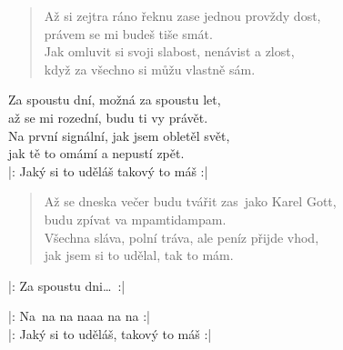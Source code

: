 \begin{song}{}
\begin{verse}
   Až si zejtra ráno řeknu zase jednou provždy dost, \\
   právem se mi budeš tiše smát. \\
   Jak omluvit si svoji slabost, nenávist a zlost, \\
   když za všechno si můžu vlastně sám.
\end{verse}
\begin{refren}
   Za spoustu dní, možná za spoustu let,  \\
   až se mi rozední, budu ti vy právět. \\
   Na první signální, jak jsem obletěl svět,  \\
   jak tě to omámí a nepustí zpět. \\
   |: Jaký si to uděláš takový to máš :| 
\end{refren}
\begin{verse}
   Až se dneska večer budu tvářit zas~jako Karel Gott, \\
   budu zpívat va mpamtidampam. \\
   Všechna sláva, polní tráva, ale peníz přijde vhod, \\
   jak jsem si to udělal, tak to mám.
\end{verse}
\begin{refren}
   |: Za spoustu dni\ldots~:|
\end{refren}
\begin{deco}
  |: Na~na na naaa na na  :| \\
   |: Jaký si to uděláš, takový to máš :| \\
\end{deco}
\end{song}
\pagebreak
